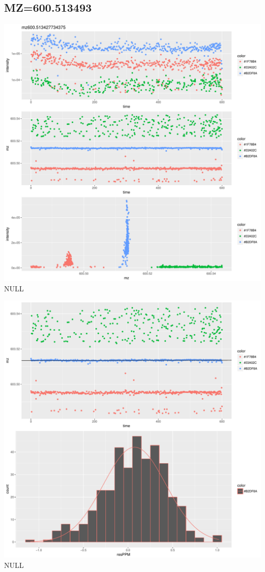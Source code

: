 \documentclass[]{article}
\begin{document}
\subsection{MZ=600.513493}\label{mz600.513493}

\includegraphics{Supplementary_document_files/figure-latex/cluster.mz.600-1.pdf}
NULL

\includegraphics{Supplementary_document_files/figure-latex/filter.lm.600-1.pdf}
NULL
\end{document}
